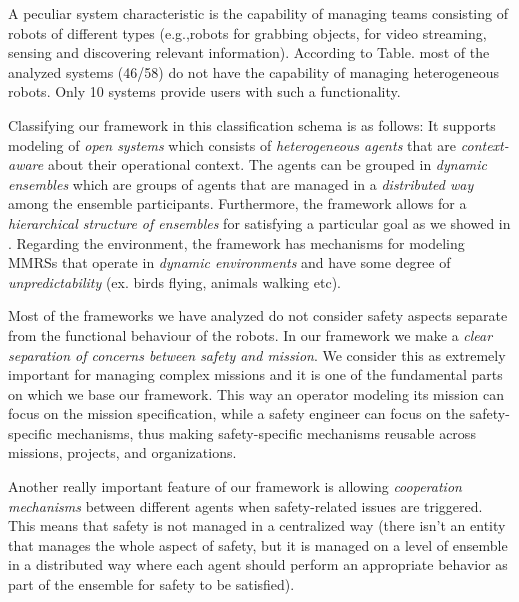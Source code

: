 \documentclass[journal]{IEEEtran}
\theoremstyle{definition}
\begin{document}
A  peculiar  system  characteristic  is  the  capability  of managing  teams  consisting  of  robots  of  different  types  (e.g.,robots for grabbing objects,  for video streaming,  sensing and discovering  relevant  information). According  to  Table. most of the analyzed systems (46/58) do not have the capability of managing heterogeneous robots. 
Only 10 systems provide users with such a functionality.



Classifying our framework in this classification schema is as follows:
It supports modeling of
  \textit{open systems} which consists of \textit{heterogeneous agents} that are \textit{context-aware} about their operational context. The agents can be grouped in \textit{dynamic ensembles} which are groups of agents that are managed in a \textit{distributed way} among the ensemble participants. Furthermore, the framework allows for a \textit{hierarchical structure of ensembles} for satisfying a particular goal as we showed in \cite{bozhinoski2016leveraging}.
Regarding the environment, the framework has mechanisms for modeling MMRSs that operate in \textit{dynamic environments} and have some degree of \textit{unpredictability} (ex. birds flying, animals walking etc).

Most of the frameworks we have analyzed do not consider safety aspects separate from the functional behaviour of the robots. In our framework we make a \textit{clear separation of concerns between safety and mission}. We consider this as extremely important for managing complex missions and it is one of the fundamental parts on which we base our framework. This way an operator modeling its mission can focus on the mission specification, while a safety engineer can focus on the safety-specific mechanisms, thus making safety-specific mechanisms reusable across missions, projects, and organizations.

Another really important feature of our framework is allowing \textit{cooperation mechanisms} between different agents when safety-related issues are triggered. This means that safety is not managed in a centralized way (there isn't an  entity that manages the whole aspect of safety, but it is managed on a level of ensemble in a distributed way where each agent should perform an appropriate behavior as part of the ensemble for safety to be satisfied).
\end{document}
